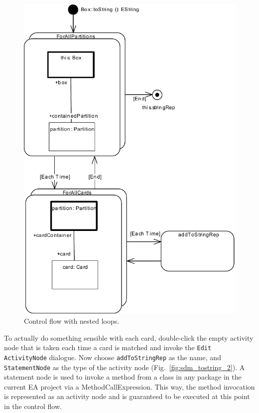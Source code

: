 \begin{figure}[htbp]
\begin{center}
  \includegraphics[width=\textwidth]{pics/sdmBilder/toString/sdm72.pdf}
  \caption{Control flow with nested loops.}  
  \label{fig:sdm_tostring_1}
\end{center}
\end{figure}

To actually do something sensible with each card, double-click the empty
activity node that is taken each time a card is matched and invoke the \texttt{Edit
ActivityNode} dialogue.  Now choose \texttt{addToStringRep} as
the name, and \texttt{StatementNode} as the type of the activity node
(Fig.~\ref{fig:sdm_tostring_2}).
A statement node is used to invoke a method from a class in any package in the
current EA project via a MethodCallExpression.  This way, the method invocation
is represented as an activity node and is guaranteed to be executed at this
point in the control flow. 

